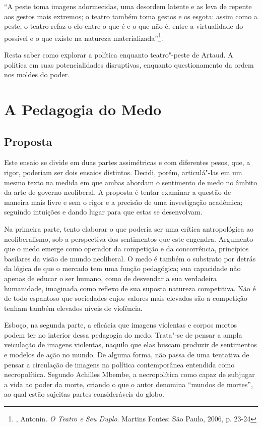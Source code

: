 ``A peste toma imagens adormecidas, uma desordem latente e as leva de
repente aos gestos mais extremos; o teatro também toma gestos e os
esgota: assim como a peste, o teatro refaz o elo entre o que é e o que
não é, entre a virtualidade do possível e o que existe na natureza
materializada''\footnote{, Antonin. \emph{O Teatro e Seu Duplo}.
  Martins Fontes: São Paulo, 2006, p. 23-24}.

Resta saber como explorar a política enquanto teatro"-peste de Artaud. A
política em suas potencialidades disruptivas, enquanto questionamento da
ordem nos moldes do poder.

\chapter{A Pedagogia do Medo}

\section{Proposta}

Este ensaio se divide em duas partes assimétricas e com diferentes
pesos, que, a rigor, poderiam ser dois ensaios distintos. Decidi, porém,
articulá"-las em um mesmo texto na medida em que ambas abordam o
sentimento de medo no âmbito da arte de governo neoliberal. A proposta é
tentar examinar a questão de maneira mais livre e sem o rigor e a
precisão de uma investigação acadêmica; seguindo intuições e dando lugar
para que estas se desenvolvam.

Na primeira parte, tento elaborar o que poderia ser uma crítica
antropológica ao neoliberalismo, sob a perspectiva dos sentimentos que
este engendra. Argumento que o medo emerge como operador da competição e
da concorrência, princípios basilares da visão de mundo neoliberal. O
medo é também o substrato por detrás da lógica de que o mercado tem uma
função pedagógica; sua capacidade não apenas de educar o ser humano,
como de desvendar a sua verdadeira humanidade, imaginada como reflexo de
sua suposta natureza competitiva. Não é de todo espantoso que sociedades
cujos valores mais elevados são a competição tenham também elevados
níveis de violência.

Esboço, na segunda parte, a eficácia que imagens violentas e corpos
mortos podem ter no interior dessa pedagogia do medo. Trata"-se de pensar
a ampla veiculação de imagens violentas, naquilo que elas buscam
produzir de sentimentos e modelos de ação no mundo. De alguma forma, não
passa de uma tentativa de pensar a circulação de imagens na política
contemporânea entendida como necropolítica. Segundo Achilles Mbembe, a
necropolítica como capaz de subjugar a vida ao poder da morte, criando o
que o autor denomina ``mundos de mortes'', ao qual estão sujeitas partes
consideráveis do globo.

